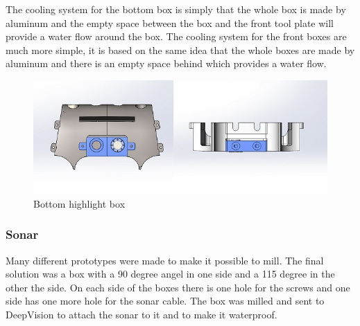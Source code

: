 The cooling system for the bottom box is simply that the whole box is made by aluminum and the empty space between the box and the front tool plate will provide a water flow around the box. 
The cooling system for the front boxes are much more simple, it is based on the same idea that the whole boxes are made by aluminum and there is an empty space behind which provides a water flow.


	\begin{figure}[!ht]
		\begin{center}
			\includegraphics[width=150mm]{./Images/Mechanics/Ledb.jpg}
			\caption{Bottom highlight box}
			\label{bottomleds}
		\end{center}
	\end{figure}

	\subsubsection{Sonar} 
\label{sonarsection}
Many different prototypes were made to make it possible to mill. The final solution was a box with a 90 degree angel in one side and a 115 degree in the other the side. On each side of the boxes there is one hole for the screws and one side has one more hole for the sonar cable. The box was milled and sent to DeepVision to attach the sonar to it and to make it waterproof.



